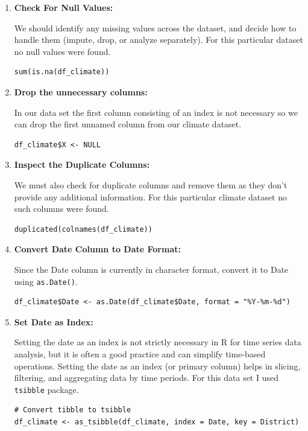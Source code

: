 \begin{enumerate}
\item \textbf{Check For Null Values:}

We should identify any missing values across the dataset, and decide how to handle them (impute, drop, or analyze separately). For this particular dataset no null values were found.

\begin{verbatim}
sum(is.na(df_climate))
\end{verbatim}

\item\textbf{Drop the unnecessary columns:}

In our data set the first column consisting of an index is not necessary so we can drop the first unnamed column from our climate dataset.

\begin{verbatim}
df_climate$X <- NULL
\end{verbatim}

\item\textbf{Inspect the Duplicate Columns:}

We must also check for duplicate columns and remove them as they don't provide any additional information. For this particular climate dataset no such columns were found.

\begin{verbatim}
duplicated(colnames(df_climate))
\end{verbatim}

\item\textbf{Convert Date Column to Date Format:}

Since the Date column is currently in character format, convert it to Date using \texttt{as.Date()}.

\begin{verbatim}
df_climate$Date <- as.Date(df_climate$Date, format = "%Y-%m-%d")
\end{verbatim}

\item \textbf{Set Date as Index:}

Setting the date as an index is not strictly necessary in R for time series data analysis, but it is often a good practice and can simplify time-based operations. Setting the date as an index (or primary column) helps in slicing, filtering, and aggregating data by time periods. For this data set I used \texttt{tsibble} package.

\begin{verbatim}
# Convert tibble to tsibble
df_climate <- as_tsibble(df_climate, index = Date, key = District)


\end{verbatim}
\end{enumerate}
